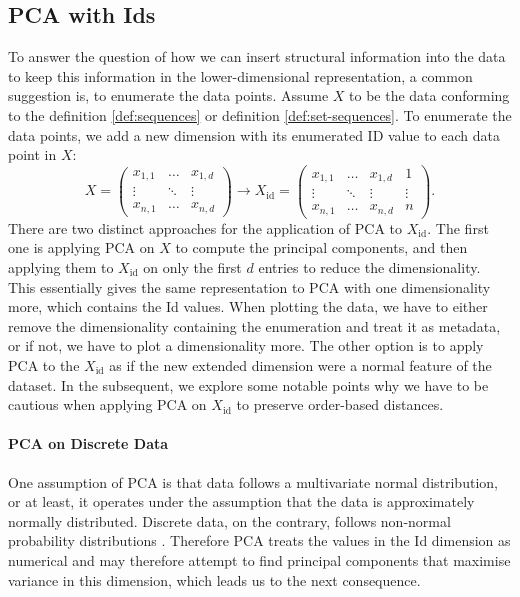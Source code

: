 \documentclass[pdftex,12pt,a4paper]{report}
\begin{document}
\subsection{PCA with Ids} \label{subsec:idpca}
To answer the question of how we can insert structural information into the data to keep this information in the lower-dimensional representation, a common suggestion is, to enumerate the data points.
Assume $X$ to be the data conforming to the definition \ref{def:sequences} or definition \ref{def:set-sequences}.
To enumerate the data points, we add a new dimension with its enumerated ID value to each data point in $X$:
\begin{equation*}
    X = 
    \begin{pmatrix}
        x_{1,1} & \dots & x_{1,d} \\
        \vdots & \ddots & \vdots \\
        x_{n,1} & \dots & x_{n,d}
    \end{pmatrix}
    \rightarrow
    X_{\mathrm{id}} = 
    \begin{pmatrix}
        x_{1,1} & \dots & x_{1,d} & 1 \\
        \vdots & \ddots & \vdots & \vdots \\
        x_{n,1} & \dots & x_{n,d} & n
    \end{pmatrix}.
\end{equation*} 
There are two distinct approaches for the application of PCA to $X_{\mathrm{id}}$.
The first one is applying PCA on $X$ to compute the principal components, and then applying them to $X_{\mathrm{id}}$ on only the first $d$ entries to reduce the dimensionality.
This essentially gives the same representation to PCA with one dimensionality more, which contains the Id values.
When plotting the data, we have to either remove the dimensionality containing the enumeration and treat it as metadata, or if not, we have to plot a dimensionality more.
The other option is to apply PCA to the $X_{\mathrm{id}}$ as if the new extended dimension were a normal feature of the dataset.
In the subsequent, we explore some notable points why we have to be cautious when applying PCA on $X_{\mathrm{id}}$ to preserve order-based distances.
\paragraph{PCA on Discrete Data}
One assumption of PCA is that data follows a multivariate normal distribution, or at least, it operates under the assumption that the data is approximately normally distributed.
Discrete data, on the contrary, follows non-normal probability distributions \cite{pca-not-for-discrete}.
Therefore PCA treats the values in the Id dimension as numerical and may therefore attempt to find principal components that maximise variance in this dimension, which leads us to the next consequence.
\end{document}
